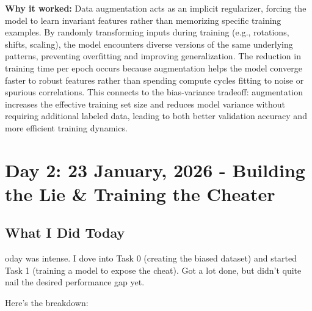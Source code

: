 \documentclass[9pt,a4paper,twocolumn,twoside]{tau-class/tau}
\begin{document}
        \begin{note}
            \textbf{Why it worked:} Data augmentation acts as an implicit regularizer, forcing the model to learn invariant features rather than memorizing specific training examples. By randomly transforming inputs during training (e.g., rotations, shifts, scaling), the model encounters diverse versions of the same underlying patterns, preventing overfitting and improving generalization. The reduction in training time per epoch occurs because augmentation helps the model converge faster to robust features rather than spending compute cycles fitting to noise or spurious correlations. This connects to the bias-variance tradeoff: augmentation increases the effective training set size and reduces model variance without requiring additional labeled data, leading to both better validation accuracy and more efficient training dynamics.
        \end{note}


\section{Day 2: 23 January, 2026 - Building the Lie \& Training the Cheater}

    \subsection{What I Did Today}
    
        oday was intense. I dove into Task 0 (creating the biased dataset) and started Task 1 (training a model to expose the cheat). Got a lot done, but didn't quite nail the desired performance gap yet.
        
        Here's the breakdown:
        
\end{document}
